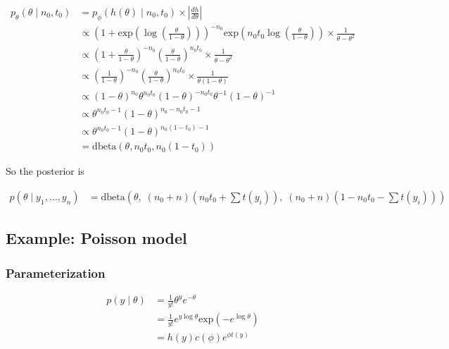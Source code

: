 \documentclass[
]{article}
\begin{document}
\begin{align}
p_{\theta}(\theta \mid n_0, t_0) &= p_{\phi}(h(\theta) \mid n_0, t_0) \times \left| \frac{dh}{d\theta} \right| \\
&\propto \left(1 + \text{exp}\left(\log \left(\frac{\theta}{1 - \theta}\right)\right)\right)^{-n_0} \text{exp}\left(n_0 t_0 \log \left(\frac{\theta}{1 - \theta}\right) \right) \times \frac{1}{\theta - \theta^2} \\
&\propto \left(1 + \frac{\theta}{1 - \theta} \right)^{-n_0} \left(\frac{\theta}{1 - \theta}\right)^{n_0 t_0} \times \frac{1}{\theta - \theta^2} \\
&\propto \left(\frac{1}{1 - \theta} \right)^{-n_0} \left(\frac{\theta}{1 - \theta}\right)^{n_0 t_0} \times \frac{1}{\theta (1 - \theta)} \\
&\propto (1 - \theta)^{n_0} \theta^{n_0 t_0} (1 - \theta)^{-n_0 t_0} \theta^{-1} (1 - \theta)^{-1} \\
&\propto \theta^{n_0 t_0 - 1} (1 - \theta)^{n_0 - n_0t_0 - 1} \\
&\propto \theta^{n_0 t_0 - 1} (1 - \theta)^{n_0 (1 - t_0) - 1} \\
&= \text{dbeta}(\theta, n_0 t_0, n_0 (1 - t_0))
\end{align}

So the posterior is

\begin{align}
p(\theta \mid y_1, \dots, y_n) &= \text{dbeta}\left(\theta,\; (n_0 + n)\left(n_0 t_0 + \sum t(y_i) \right),\; (n_0 + n) \left(1 - n_0 t_0 - \sum t(y_i) \right) \right)
\end{align}

\hypertarget{example-poisson-model}{%
\subsection{Example: Poisson model}\label{example-poisson-model}}

\hypertarget{parameterization-1}{%
\subsubsection{Parameterization}\label{parameterization-1}}

\begin{align}
p(y \mid \theta) &= \frac{1}{y!} \theta^{y} e^{-\theta} \\
&= \frac{1}{y!} e^{y \log \theta} \text{exp}(-e^{\log \theta}) \\
&= h(y) c(\phi) e^{\phi t(y)} \\
\end{align}
\end{document}
